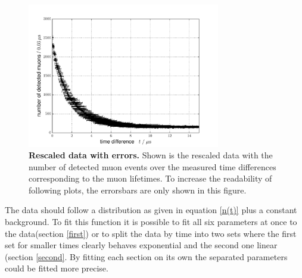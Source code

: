 \documentclass{include/thesisclass3}
\begin{document}
\begin{figure}[H]
	\begin{center}
		\includegraphics[width=0.75\textwidth]{images/errors.pdf}
		\caption{\label{raw}\textbf{Rescaled data with errors.} Shown is the rescaled data with the number of detected muon events over the measured time differences corresponding to the muon lifetimes. To increase the readability of following plots, the errorsbars are only shown in this figure.}
	\end{center}
\end{figure}
The data should follow a distribution as given in equation \ref{n(t)} plus a constant background. 
To fit this function it is possible to fit all six parameters at once to the data(section \ref{first}) or to split the data by time into two sets where the first set for smaller times clearly behaves exponential and the second one linear (section \ref{second}. By fitting each section on its own the separated parameters could be fitted more precise. 
\end{document}
